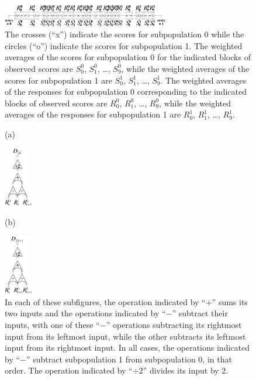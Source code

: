 \documentclass{article}
\begin{document}
\begin{figure}
\begin{centering}
\hfil\parbox{0.65\textwidth}
{\includegraphics[width=0.65\textwidth]{./partition.pdf}}
\end{centering}
\caption{The crosses (``x'') indicate the scores for subpopulation 0
while the circles (``o'') indicate the scores for subpopulation 1.
The weighted averages of the scores for subpopulation 0
for the indicated blocks of observed scores are
$S^0_0$, $S^0_1$, \dots, $S^0_9$,
while the weighted averages of the scores for subpopulation 1 are
$S^1_0$, $S^1_1$, \dots, $S^1_9$.
The weighted averages of the responses for subpopulation 0 corresponding
to the indicated blocks of observed scores are
$R^0_0$, $R^0_1$, \dots, $R^0_9$, while the weighted averages of the responses
for subpopulation 1 are $R^1_0$, $R^1_1$, \dots, $R^1_9$.
}
\label{partition}
\end{figure}

\begin{figure}
\vspace{.2in}
\begin{centering}
\hfil
(a) \parbox{0.111\textwidth}
{\includegraphics[width=0.111\textwidth]{./diffs0.pdf}}
\hfil
(b) \parbox{0.111\textwidth}
{\includegraphics[width=0.111\textwidth]{./diffs1.pdf}}
\end{centering}
\caption{In each of these subfigures, the operation indicated by ``$+$'' sums
its two inputs and the operations indicated by ``$-$'' subtract their inputs,
with one of these ``$-$'' operations subtracting its rightmost input
from its leftmost input, while the other subtracts its leftmost input
from its rightmost input.
In all cases, the operations indicated by ``$-$'' subtract
subpopulation 1 from subpopulation 0, in that order.
The operation indicated by ``$\div 2$'' divides its input by 2.
}
\label{diffs}
\end{figure}
\end{document}
